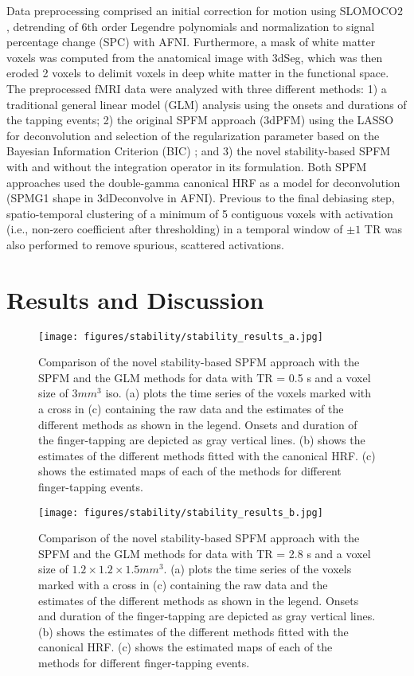 Data preprocessing comprised an initial correction for motion using SLOMOCO2
\citep{Beall2014SimPACEGeneratingsimulated}, detrending of 6th order Legendre
polynomials and normalization to signal percentage change (SPC) with AFNI.
Furthermore, a mask of white matter voxels was computed from the anatomical
image with 3dSeg, which was then eroded 2 voxels to delimit voxels in deep white
matter in the functional space. The preprocessed fMRI data were analyzed with
three different methods: 1) a traditional general linear model (GLM) analysis
using the onsets and durations of the tapping events; 2) the original SPFM
approach (3dPFM) using the LASSO for deconvolution and selection of the
regularization parameter based on the Bayesian Information Criterion (BIC)
\citep{Gaudes2013Paradigmfreemapping}; and 3) the novel stability-based SPFM
with and without the integration operator in its formulation. Both SPFM
approaches used the double-gamma canonical HRF as a model for deconvolution
(SPMG1 shape in 3dDeconvolve in AFNI). Previous to the final debiasing step,
spatio-temporal clustering of a minimum of 5 contiguous voxels with activation
(i.e., non-zero coefficient after thresholding) in a temporal window of $\pm 1$
TR was also performed to remove spurious, scattered activations.

\section{Results and Discussion}
\label{sec:stability_results}

\begin{figure}[!ht]
    \centering
    \texttt{[image: figures/stability/stability\_results\_a.jpg]}
    \caption{Comparison of the novel stability-based SPFM approach with the SPFM
    and the GLM methods for data with TR = 0.5 s and a voxel size of $3 {mm}^3$
    iso. (a) plots the time series of the voxels marked with a cross in (c)
    containing the raw data and the estimates of the different methods as shown
    in the legend. Onsets and duration of the finger-tapping are depicted as
    gray vertical lines. (b) shows the estimates of the different methods fitted
    with the canonical HRF. (c) shows the estimated maps of each of the methods
    for different finger-tapping events.}
    \label{fig:stability_results_a}
\end{figure}

\begin{figure}[!ht]
    \centering
    \texttt{[image: figures/stability/stability\_results\_b.jpg]}
    \caption{Comparison of the novel stability-based SPFM approach with the SPFM
    and the GLM methods for data with TR = 2.8 s and a voxel size of
    $1.2\times1.2\times1.5 {mm}^3$. (a) plots the time series of the voxels
    marked with a cross in (c) containing the raw data and the estimates of the
    different methods as shown in the legend. Onsets and duration of the
    finger-tapping are depicted as gray vertical lines. (b) shows the estimates
    of the different methods fitted with the canonical HRF. (c) shows the
    estimated maps of each of the methods for different finger-tapping events.}
    \label{fig:stability_results_b}
\end{figure}

